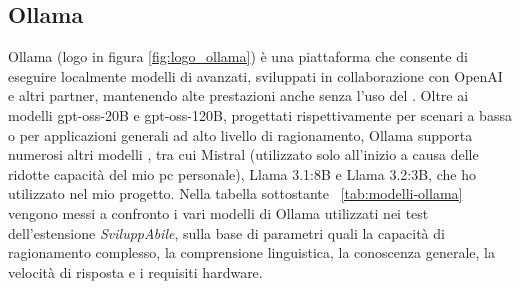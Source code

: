 \subsection{Ollama}
\label{subsec:ollama}
\noindent Ollama (logo in figura \ref{fig:logo_ollama}) è una piattaforma che consente di eseguire localmente modelli di  avanzati, sviluppati in collaborazione con OpenAI e altri partner, mantenendo alte prestazioni anche senza l’uso del . 
Oltre ai modelli gpt-oss-20B e gpt-oss-120B, progettati rispettivamente per scenari a bassa  o per applicazioni generali ad alto livello di ragionamento, Ollama supporta numerosi altri modelli , tra cui Mistral (utilizzato solo all’inizio a causa delle ridotte capacità del mio pc personale), Llama 3.1:8B e Llama 3.2:3B, che ho utilizzato nel mio progetto. Nella tabella sottostante ~\ref{tab:modelli-ollama} vengono messi a confronto i vari modelli di Ollama utilizzati nei test dell'estensione \textit{SviluppAbile}, sulla base di parametri quali la capacità di ragionamento complesso, la comprensione linguistica, la conoscenza generale, la velocità di risposta e i requisiti hardware.\\ 

